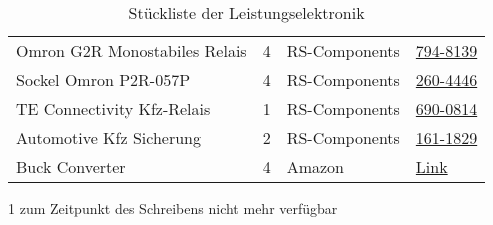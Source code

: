 \begin{table}[h]
\begin{threeparttable}
\begin{tabular}{|l|c|M{3cm}|l|}
    Omron G2R Monostabiles Relais & 4 & RS-Components & \href{https://at.rs-online.com/web/p/monostabile-relais/7948139/}{794-8139}\\
    Sockel Omron P2R-057P & 4 & RS-Components & \href{https://at.rs-online.com/web/p/einbaumessgerate-zubehor/2604446/}{260-4446}\\
    TE Connectivity Kfz-Relais & 1 & RS-Components & \href{https://at.rs-online.com/web/p/monostabile-relais/6900814}{690-0814} \\
    Automotive Kfz Sicherung & 2 & RS-Components & \href{https://at.rs-online.com/web/p/kfz-sicherungen/1611829/}{161-1829}\\\hline
    Buck Converter & 4 & Amazon & \href{https://www.amazon.de/gp/product/B085DSMFQM/ref=ppx_yo_dt_b_asin_image_o03_s00?ie=UTF8&psc=1}{Link} \\\hline 
    \end{tabular}
    \begin{tablenotes}\footnotesize 
        \item[1] zum Zeitpunkt des Schreibens nicht mehr verfügbar 
    \end{tablenotes}
\end{threeparttable}
    \caption{Stückliste der Leistungselektronik}
\end{table}

\newpage